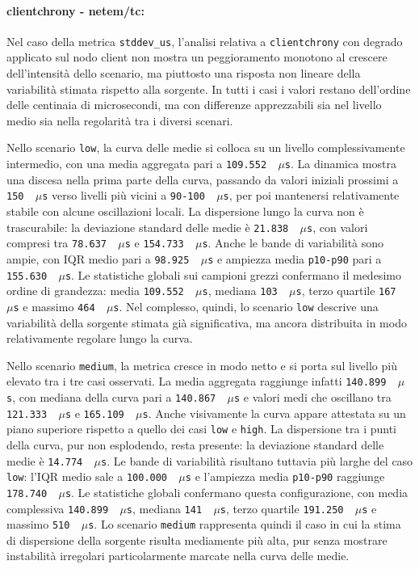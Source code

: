 \paragraph*{clientchrony - netem/tc:}
Nel caso della metrica \texttt{stddev\_us}, l'analisi relativa a \texttt{clientchrony}
con degrado applicato sul nodo client non mostra un peggioramento monotono al crescere
dell'intensità dello scenario, ma piuttosto una risposta non lineare della
variabilità stimata rispetto alla sorgente. In tutti i casi i valori restano dell'ordine
delle centinaia di microsecondi, ma con differenze apprezzabili sia nel livello
medio sia nella regolarità tra i diversi scenari.

Nello scenario \texttt{low}, la curva delle medie si colloca su un livello
complessivamente intermedio, con una media aggregata pari a \texttt{109.552 \,$\mu$s}.
La dinamica mostra una discesa nella prima parte della curva, passando da valori
iniziali prossimi a \texttt{150 \,$\mu$s} verso livelli più vicini a \texttt{90{-}100
\,$\mu$s}, per poi mantenersi relativamente stabile con alcune oscillazioni locali.
La dispersione lungo la curva non è trascurabile: la deviazione standard delle medie
è \texttt{21.838 \,$\mu$s}, con valori compresi tra \texttt{78.637 \,$\mu$s} e
\texttt{154.733 \,$\mu$s}. Anche le bande di variabilità sono ampie, con IQR medio
pari a \texttt{98.925 \,$\mu$s} e ampiezza media \texttt{p10-p90} pari a \texttt{155.630
\,$\mu$s}. Le statistiche globali sui campioni grezzi confermano il medesimo ordine
di grandezza: media \texttt{109.552 \,$\mu$s}, mediana \texttt{103 \,$\mu$s},
terzo quartile \texttt{167 \,$\mu$s} e massimo \texttt{464 \,$\mu$s}. Nel complesso,
quindi, lo scenario \texttt{low} descrive una variabilità della sorgente stimata
già significativa, ma ancora distribuita in modo relativamente regolare lungo la curva.

Nello scenario \texttt{medium}, la metrica cresce in modo netto e si porta sul livello
più elevato tra i tre casi osservati. La media aggregata raggiunge infatti
\texttt{140.899 \,$\mu$s}, con mediana della curva pari a \texttt{140.867 \,$\mu$s}
e valori medi che oscillano tra \texttt{121.333 \,$\mu$s} e \texttt{165.109 \,$\mu$s}.
Anche visivamente la curva appare attestata su un piano superiore rispetto a
quello dei casi \texttt{low} e \texttt{high}. La dispersione tra i punti della curva,
pur non esplodendo, resta presente: la deviazione standard delle medie è \texttt{14.774
\,$\mu$s}. Le bande di variabilità risultano tuttavia più larghe del caso
\texttt{low}: l'IQR medio sale a \texttt{100.000 \,$\mu$s} e l'ampiezza media \texttt{p10-p90}
raggiunge \texttt{178.740 \,$\mu$s}. Le statistiche globali confermano questa
configurazione, con media complessiva \texttt{140.899 \,$\mu$s}, mediana \texttt{141
\,$\mu$s}, terzo quartile \texttt{191.250 \,$\mu$s} e massimo \texttt{510 \,$\mu$s}.
Lo scenario \texttt{medium} rappresenta quindi il caso in cui la stima di dispersione
della sorgente risulta mediamente più alta, pur senza mostrare instabilità
irregolari particolarmente marcate nella curva delle medie.

